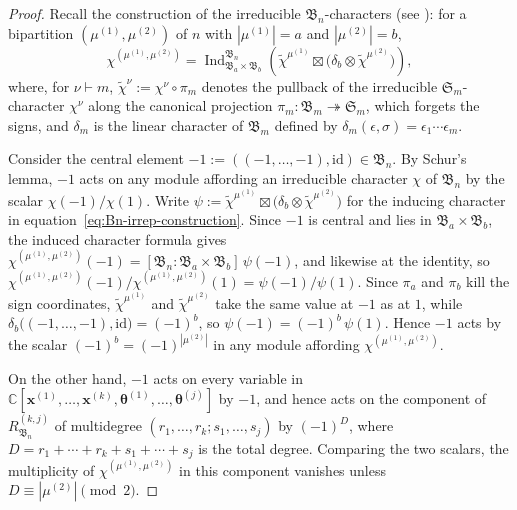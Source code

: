 \documentclass[12pt]{amsart}
\theoremstyle{plain}
\theoremstyle{definition}
\DeclareMathOperator{\Ind}{Ind}
\newcommand{\C}{\mathbb{C}}
\begin{document}
\begin{proof}
Recall the construction of the irreducible $\mathfrak{B}_n$-characters (see \cite[Section 5.5]{GeckPfeiffer}): for a bipartition $(\mu^{(1)}, \mu^{(2)})$ of $n$ with $|\mu^{(1)}| = a$ and $|\mu^{(2)}| = b$,
\begin{equation}\label{eq:Bn-irrep-construction}
\chi^{(\mu^{(1)},\mu^{(2)})} =
\Ind_{\mathfrak{B}_a \times \mathfrak{B}_b}^{\mathfrak{B}_n}
\left( \tilde{\chi}^{\mu^{(1)}}
\boxtimes \big( \delta_b \otimes  \tilde{\chi}^{\mu^{(2)}}  \big) \right),
\end{equation}
where, for $\nu \vdash m$, $\tilde{\chi}^{\nu} := \chi^\nu \circ \pi_m$ denotes the pullback of the irreducible $\mathfrak{S}_m$-character $\chi^\nu$ along the canonical projection $\pi_m \colon \mathfrak{B}_m \twoheadrightarrow \mathfrak{S}_m$, which forgets the signs, and $\delta_m$ is the linear character of $\mathfrak{B}_m$ defined by $\delta_m(\epsilon, \sigma) = \epsilon_1 \cdots \epsilon_m$.

Consider the central element $-1 := ((-1,\ldots,-1), \mathrm{id}) \in \mathfrak{B}_n$.
By Schur's lemma, $-1$ acts on any module affording an irreducible character $\chi$ of $\mathfrak{B}_n$ by the scalar $\chi(-1)/\chi(1)$.
Write $\psi := \tilde{\chi}^{\mu^{(1)}} \boxtimes \big( \delta_b \otimes \tilde{\chi}^{\mu^{(2)}} \big)$ for the inducing character in equation~\eqref{eq:Bn-irrep-construction}.
Since $-1$ is central and lies in $\mathfrak{B}_a \times \mathfrak{B}_b$, the induced character formula gives $\chi^{(\mu^{(1)},\mu^{(2)})}(-1) = [\mathfrak{B}_n : \mathfrak{B}_a \times \mathfrak{B}_b]\, \psi(-1)$, and likewise at the identity, so $\chi^{(\mu^{(1)},\mu^{(2)})}(-1)/\chi^{(\mu^{(1)},\mu^{(2)})}(1) = \psi(-1)/\psi(1)$.
Since $\pi_a$ and $\pi_b$ kill the sign coordinates, $\tilde{\chi}^{\mu^{(1)}}$ and $\tilde{\chi}^{\mu^{(2)}}$ take the same value at $-1$ as at $1$, while $\delta_b\big((-1,\ldots,-1),\mathrm{id}\big) = (-1)^{b}$, so $\psi(-1) = (-1)^{b}\, \psi(1)$.
Hence $-1$ acts by the scalar $(-1)^{b} = (-1)^{|\mu^{(2)}|}$ in any module affording $\chi^{(\mu^{(1)},\mu^{(2)})}$.

On the other hand, $-1$ acts on every variable in $\C[\bm{x}^{(1)},\ldots,\bm{x}^{(k)},\bm{\theta}^{(1)},\ldots,\bm{\theta}^{(j)}]$ by $-1$, and hence acts on the component of $R_{\mathfrak{B}_n}^{(k,j)}$ of multidegree $(r_1,\ldots,r_k;s_1,\ldots,s_j)$ by $(-1)^{D}$, where $D = r_1 + \cdots + r_k + s_1 + \cdots + s_j$ is the total degree.
Comparing the two scalars, the multiplicity of $\chi^{(\mu^{(1)},\mu^{(2)})}$ in this component vanishes unless $D \equiv |\mu^{(2)}| \pmod{2}$.


\end{proof}
\end{document}
